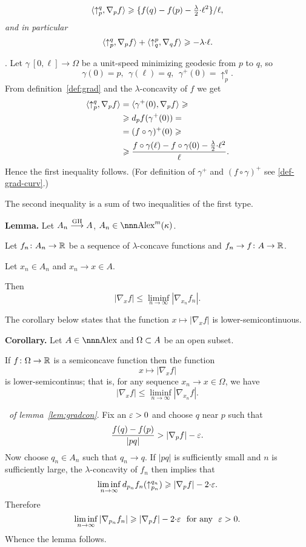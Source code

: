 \documentclass{article}
\begin{document}
\vspace{-5mm}
$$\langle\uparrow_p^q,\nabla_p f\rangle\geqslant
{\{f(q)-f(p)-\tfrac\lambda2{\cdot}\ell^2\}}/{\ell},$$
{\it and in particular}
$$
\langle\uparrow_p^q,\nabla_p f\rangle
+
\langle\uparrow_q^p,\nabla_q f\rangle
\geqslant 
-\lambda{\cdot}\ell.
$$

\Proof. 
Let $\gamma\:[0,\ell]\to \Omega$ be a unit-speed minimizing geodesic from $p$ to $q$, so 
$$\gamma(0)=p,\ \ \gamma(\ell)=q,\ \ \gamma^+(0)=\uparrow_p^q.$$
From definition~\ref{def:grad} and the $\lambda$-concavity of $f$ we get
\begin{align*}
\langle\uparrow_p^q,\nabla_p f\rangle
&=
\langle \gamma^+(0),\nabla_p f\rangle
\geqslant
\\
&\geqslant
d_p f(\gamma^+(0))=
\\
&=(f\circ\gamma)^+(0)
\geqslant
\\
&\geqslant
\frac{f\circ\gamma(\ell)-f\circ\gamma(0)-\tfrac{\lambda}2{\cdot}\ell^2}{\ell}.
\end{align*}
Hence the first inequality follows. 
(For definition of $\gamma^+$ and $(f\circ\gamma)^+$ 
see \ref{def-grad-curv}.)

The second inequality is a sum of two inequalities of the first type. 
\qeds

\begin{thm}{\bf Lemma.} \label{lem:gradcon}
Let $A_n \GHto A$, $A_n\in \Alex^m(\kappa)$.

Let  $f_n\colon A_n\to \mathbb{R}$ be a sequence of $\lambda$-concave 
functions and $f_n\to f\colon A\to \mathbb{R}$. 

Let $x_n\in A_n$ and $x_n\to x\in A$.

Then 
$$|\nabla_x f|\le \liminf_{n\to \infty} |\nabla_{x_n} f_n|.$$
\end{thm}

The corollary below states that the function $x\mapsto |\nabla_x f|$ is lower-semicontinuous.

\begin{thm}{\bf Corollary.} \label{cor:gradlim} Let $A\in\Alex$ and $\Omega\subset A$
be an open subset. 

If $f\colon\Omega\to\mathbb{R}$ is a semiconcave function then the function $$x\mapsto|\nabla_x f|$$ 
is lower-semicontinus;
that is,
for any sequence $x_n\to x\in \Omega$, we
have 
$$|\nabla_x f|\le \liminf_{n\to \infty} |\nabla_{x_n} f|.$$

\end{thm}

\Proof\  {\it of lemma~\ref{lem:gradcon}}. Fix an $\varepsilon>0$ and choose $q$ near
$p$ such
that 
$$\frac{f(q)-f(p)}{|p q|}> |\nabla_p f|-\varepsilon.$$
Now choose $q_n\in A_n$ such that $q_n\to q$. 
If $|p q|$ is sufficiently small and $n$ is
sufficiently large,  the $\lambda$-concavity of $f_n$ then implies that
$$\liminf_{n\to \infty}d_{p_n}f_n(\uparrow_{p_n}^{q_n})\geqslant |\nabla_p f|-2{\cdot}\varepsilon.$$
Therefore
$$\liminf_{n\to \infty} |\nabla_{p_n} f_n|\geqslant
|\nabla_p f|-2{\cdot}\varepsilon \ \ \text{for any}\ \ \varepsilon>0.$$
Whence the lemma follows.
\qeds
\end{document}
